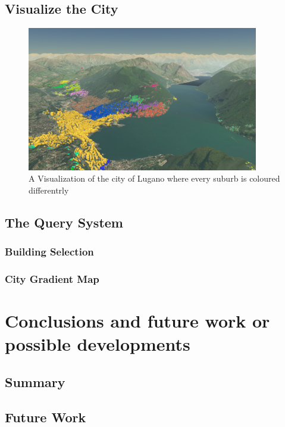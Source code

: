 \documentclass[]{usiinfbachelorproject}
\begin{document}
\subsection{Visualize the City}
\begin{figure} [H]
\centering
\includegraphics[width=0.9\textwidth]{images/application_bySuburb}
\caption{A Visualization of the city of Lugano where every suburb is coloured differentrly}
\label{fig:application_bySuburb}
\end{figure}
\subsection{The Query System}
\subsubsection{Building Selection}
\subsubsection{City Gradient Map}
\section{Conclusions and future work or possible developments} \label{conclusions}
\subsection{Summary}
\subsection{Future Work}

\end{document}
